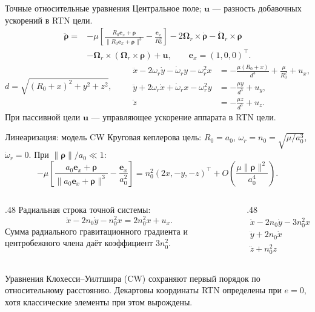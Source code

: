 \documentclass[11pt,aspectratio=169,t]{beamer}
\newcommand{\eqcompact}{\fontsize{10}{12}\selectfont}
\newcommand{\derivationmathspacing}{%
  \setlength{\abovedisplayskip}{2pt}%
  \setlength{\belowdisplayskip}{3pt}%
  \setlength{\abovedisplayshortskip}{2pt}%
  \setlength{\belowdisplayshortskip}{2pt}%
  \setlength{\jot}{2pt}}
\newcommand{\vect}[1]{\boldsymbol{#1}}
\begin{document}
\begin{frame}{Точные относительные уравнения}
\relax
\derivationmathspacing
Центральное поле; $\vect u$ --- разность добавочных ускорений в RTN цели.
{\eqcompact\derivationmathspacing
\[
\begin{aligned}
 \ddot{\vect\rho}={}&-\mu\left[
 \frac{R_0\vect e_x+\vect\rho}
 {\lVert R_0\vect e_x+\vect\rho\rVert^3}
 -\frac{\vect e_x}{R_0^2}\right]
 -2\vect\Omega_r\times\dot{\vect\rho}
 -\dot{\vect\Omega}_r\times\vect\rho\\[-1pt]
 &-\vect\Omega_r\times(\vect\Omega_r\times\vect\rho)+\vect u,
 \qquad \vect e_x=(1,0,0)^\top.
\end{aligned}
\]
\[
 d=\sqrt{(R_0+x)^2+y^2+z^2},\qquad
 \boxed{\begin{aligned}
 \ddot x-2\omega_r\dot y-\dot\omega_r y-\omega_r^2x
 &=-\frac{\mu(R_0+x)}{d^3}+\frac{\mu}{R_0^2}+u_x,\\[4pt]
 \ddot y+2\omega_r\dot x+\dot\omega_r x-\omega_r^2y
 &=-\frac{\mu y}{d^3}+u_y,\\[4pt]
 \ddot z&=-\frac{\mu z}{d^3}+u_z.
 \end{aligned}}
\]
}
\justifying
При пассивной цели $\vect u$ --- управляющее ускорение аппарата в RTN цели.
\end{frame}

\begin{frame}{Линеаризация: модель CW}
\relax
\derivationmathspacing
Круговая кеплерова цель: $R_0=a_0$, $\omega_r=n_0=\sqrt{\mu/a_0^3}$,
$\dot\omega_r=0$. При $\lVert\vect\rho\rVert/a_0\ll1$:
{\eqcompact\derivationmathspacing
\[
 -\mu\left[
 \frac{a_0\vect e_x+\vect\rho}{\lVert a_0\vect e_x+\vect\rho\rVert^3}
 -\frac{\vect e_x}{a_0^2}\right]
 =n_0^2(2x,-y,-z)^\top
 +O\!\left(\frac{\mu\lVert\vect\rho\rVert^2}{a_0^4}\right).
\]
}
\begin{columns}[T,onlytextwidth]
\begin{column}{.48\textwidth}
Радиальная строка точной системы:
{\eqcompact\derivationmathspacing
\[
 \ddot x-2n_0\dot y-n_0^2x=2n_0^2x+u_x.
\]
}
\justifying
Сумма радиального гравитационного градиента и центробежного члена даёт коэффициент $3n_0^2$.
\end{column}
\begin{column}{.48\textwidth}
{\eqcompact\derivationmathspacing
\[
 \boxed{\begin{aligned}
 \ddot x-2n_0\dot y-3n_0^2x&=u_x,\\[4pt]
 \ddot y+2n_0\dot x&=u_y,\\[4pt]
 \ddot z+n_0^2z&=u_z.
 \end{aligned}}
\]
}
\end{column}
\end{columns}
\smallskip
\justifying
Уравнения Клохесси--Уилтшира (CW) сохраняют первый порядок по относительному расстоянию.
Декартовы координаты RTN определены при $e=0$, хотя классические элементы при этом вырождены.
\end{frame}
\end{document}
